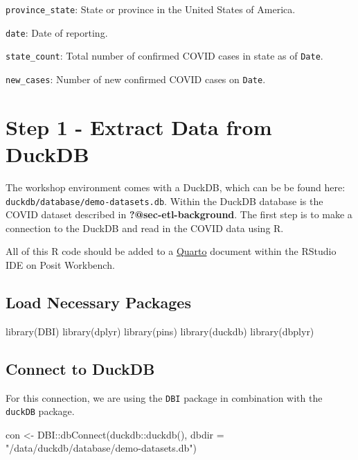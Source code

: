 \documentclass[
  letterpaper,
  DIV=11,
  numbers=noendperiod]{scrreprt}
\newenvironment{Shaded}{\begin{snugshade}}{\end{snugshade}}
\newcommand{\AttributeTok}[1]{\textcolor[rgb]{0.40,0.45,0.13}{#1}}
\newcommand{\FunctionTok}[1]{\textcolor[rgb]{0.28,0.35,0.67}{#1}}
\newcommand{\NormalTok}[1]{\textcolor[rgb]{0.00,0.23,0.31}{#1}}
\newcommand{\OtherTok}[1]{\textcolor[rgb]{0.00,0.23,0.31}{#1}}
\newcommand{\SpecialCharTok}[1]{\textcolor[rgb]{0.37,0.37,0.37}{#1}}
\newcommand{\StringTok}[1]{\textcolor[rgb]{0.13,0.47,0.30}{#1}}
\begin{document}
\texttt{province\_state}: State or province in the United States of
America.

\texttt{date}: Date of reporting.

\texttt{state\_count}: Total number of confirmed COVID cases in state as
of \texttt{Date}.

\texttt{new\_cases}: Number of new confirmed COVID cases on
\texttt{Date}.

\section{Step 1 - Extract Data from
DuckDB}\label{step-1---extract-data-from-duckdb}

The workshop environment comes with a DuckDB, which can be be found
here: \texttt{duckdb/database/demo-datasets.db}. Within the DuckDB
database is the COVID dataset described in
\textbf{?@sec-etl-background}. The first step is to make a connection to
the DuckDB and read in the COVID data using R.

All of this R code should be added to a
\href{https://quarto.org/}{Quarto} document within the RStudio IDE on
Posit Workbench.

\subsection{Load Necessary Packages}\label{load-necessary-packages}

\begin{Shaded}
\begin{Highlighting}[]
\FunctionTok{library}\NormalTok{(DBI)}
\FunctionTok{library}\NormalTok{(dplyr)}
\FunctionTok{library}\NormalTok{(pins)}
\FunctionTok{library}\NormalTok{(duckdb)}
\FunctionTok{library}\NormalTok{(dbplyr)}
\end{Highlighting}
\end{Shaded}

\subsection{Connect to DuckDB}\label{connect-to-duckdb}

For this connection, we are using the \texttt{DBI} package in
combination with the \texttt{duckDB} package.

\begin{Shaded}
\begin{Highlighting}[]
\NormalTok{con }\OtherTok{\textless{}{-}}\NormalTok{ DBI}\SpecialCharTok{::}\FunctionTok{dbConnect}\NormalTok{(duckdb}\SpecialCharTok{::}\FunctionTok{duckdb}\NormalTok{(), }\AttributeTok{dbdir =} \StringTok{"/data/duckdb/database/demo{-}datasets.db"}\NormalTok{)}
\end{Highlighting}
\end{Shaded}
\end{document}
